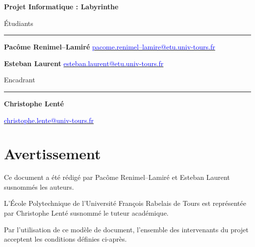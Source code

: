 \documentclass[12pt]{scrreprt} %
\begin{document}
\begin{titlepage}
\begin{center}
        \textbf{Projet Informatique : Labyrinthe}
    \end{center}
    \vfill

    \begin{minipage}[t]{0.5\textwidth}
        \begin{flushleft}
            Étudiants
            \vspace{0.1cm}
            \hrule %
            \vspace{0.5cm}

            \textbf{Pacôme Renimel--Lamiré}
            \href{mailto:pacome.renimel--lamire@etu.univ-tours.fr}{\textcolor{blue}{pacome.renimel--lamire@etu.univ-tours.fr}}

            \textbf{Esteban Laurent}
            \href{mailto:esteban.laurent@etu.univ-tours.fr}{\textcolor{blue}{esteban.laurent@etu.univ-tours.fr}}
        \end{flushleft}
    \end{minipage}
    \begin{minipage}[t]{0.5\textwidth}
        \begin{flushright}
            Encadrant

            \vspace{0.1cm}
            \hrule %
            \vspace{0.5cm}

            \textbf{Christophe Lenté}

            \href{mailto:christophe.lente@univ-tours.fr}{\textcolor{blue}{christophe.lente@univ-tours.fr}}

        \end{flushright}
    \end{minipage}
\end{titlepage}
\restoregeometry


\chapter*{Avertissement}

Ce document a été rédigé par Pacôme Renimel--Lamiré et Esteban Laurent susnommés les auteurs.

L’École Polytechnique de l’Université François Rabelais de Tours est représentée par Christophe Lenté susnommé le tuteur académique.

Par l’utilisation de ce modèle de document, l’ensemble des intervenants du projet acceptent les conditions définies ci-après.
\end{document}
